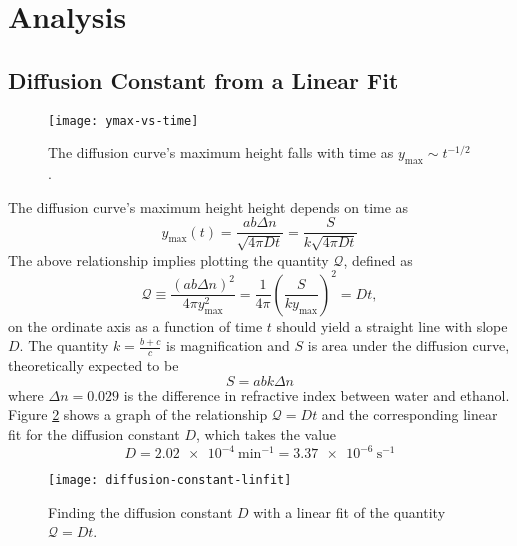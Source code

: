 \documentclass[11pt, a4paper]{article}
\begin{document}
\section{Analysis}

\subsection{Diffusion Constant from a Linear Fit} 
\label{diftek:ss:linfit}

\begin{figure}[htb!]
\texttt{[image: ymax-vs-time]}
\caption{The diffusion curve's maximum height falls with time as $ y_{\text{max}} \sim t^{-1/2} $.}
\label{diftek:fig:ymax}
\end{figure}

The diffusion curve's maximum height height depends on time as
\begin{equation*}
	y_{\text{max}}(t) = \frac{ab\Delta n}{\sqrt{4\pi D t}} = \frac{S}{k\sqrt{4\pi D t}}
\end{equation*}
The above relationship implies plotting the quantity $ \mathcal{Q} $, defined as
\begin{equation*}
	\mathcal{Q} \equiv \frac{(ab\Delta n)^{2}}{4\pi y_{\text{max}}^{2}} = \frac{1}{4\pi}\left(\frac{S}{ky_{\text{max}}}\right)^{2} = Dt,
\end{equation*}
on the ordinate axis as a function of time $ t $ should yield a straight line with slope $ D $. The quantity $ k = \frac{b + c}{c} $ is magnification and $ S $ is area under the diffusion curve, theoretically expected to be 
\begin{equation*}
	S = abk \Delta n 
\end{equation*}
where $ \Delta n = 0.029 $ is the difference in refractive index between water and ethanol. Figure \ref{diftek:fig:D-linfit} shows a graph of the relationship $ \mathcal{Q} = Dt $ and the corresponding linear fit for the diffusion constant $ D $, which takes the value
\begin{equation*}
	D = \SI{2.02e-4}{\minute^{-1}} = \SI{3.37e-6}{\second^{-1}}
\end{equation*}


\begin{figure}
\texttt{[image: diffusion-constant-linfit]}
\caption{Finding the diffusion constant $ D $ with a linear fit of the quantity $ \mathcal{Q} = Dt $.}
\label{diftek:fig:D-linfit}
\end{figure}
\end{document}
